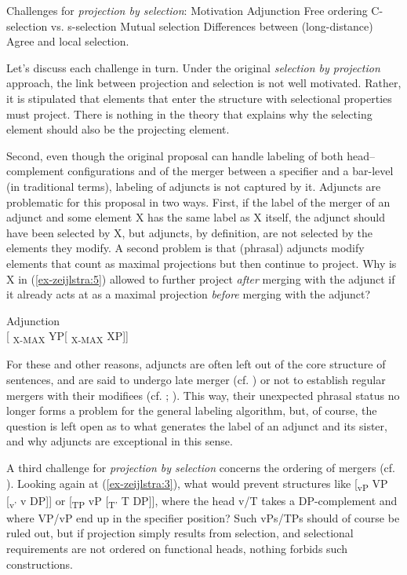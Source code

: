 \documentclass[output=paper
,modfonts
,nonflat]{langsci/langscibook}
\begin{document}
\begin{exe}
\ex Challenges for \textit{projection by selection}:
	\xlist
	\ex Motivation
	\ex Adjunction
	\ex Free ordering
	\ex C-selection vs. s-selection
	\ex Mutual selection
	\ex Differences between (long-distance) Agree and local selection.
	\endxlist
\end{exe}
Let’s discuss each challenge in turn. Under the original \textit{selection by projection} approach, the link between projection and selection is not well motivated. Rather, it is stipulated that elements that enter the structure with selectional properties must project. There is nothing in the theory that explains why the selecting element should also be the projecting element.  

Second, even though the original proposal can handle labeling of both head–complement configurations and of the merger between a specifier and a bar-level (in traditional terms), labeling of adjuncts is not captured by it. Adjuncts are problematic for this proposal in two ways. First, if the label of the merger of an adjunct and some element X has the same label as X itself, the adjunct should have been selected by X, but adjuncts, by definition, are not selected by the elements they modify. A second problem is that (phrasal) adjuncts modify elements that count as maximal projections but then continue to project. Why is X in (\ref{ex-zeijlstra:5}) allowed to further project \textit{after} merging with the adjunct if it already acts at as a maximal projection \textit{before} merging with the adjunct?  

\begin{exe}
\ex Adjunction \label{ex-zeijlstra:5} \\
	{[} \textsubscript{X-MAX} YP{[} \textsubscript{X-MAX} XP{]}{]}
\end{exe}
For these and other reasons, adjuncts are often left out of the core structure of sentences, and are said to undergo late merger (cf. \citealt{Lebeaux1988}) or not to establish regular mergers with their modifiees (cf. \citealt{Chomsky2001}; \citealt{Hornstein_Nunes2009}). This way, their unexpected phrasal status no longer forms a problem for the general labeling algorithm, but, of course, the question is left open as to what generates the label of an adjunct and its sister, and why adjuncts are exceptional in this sense.

A third challenge for \textit{projection by selection} concerns the ordering of mergers (cf. \citealt{Adger2013}). Looking again at (\ref{ex-zeijlstra:3}), what would prevent structures like {[}\textsubscript{vP} VP {[}\textsubscript{v'} v DP{]}{]} or {[}\textsubscript{TP} vP {[}\textsubscript{T'} T DP{]}{]}, where the head v/T takes a DP-complement and where VP/vP end up in the specifier position? Such vPs/TPs should of course be ruled out, but if projection simply results from selection, and selectional requirements are not ordered on functional heads, nothing forbids such constructions.
\end{document}
